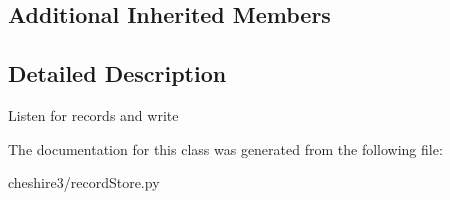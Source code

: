 \subsection*{Additional Inherited Members}


\subsection{Detailed Description}
\begin{DoxyVerb}Listen for records and write \end{DoxyVerb}
 

The documentation for this class was generated from the following file\-:\begin{DoxyCompactItemize}
\item 
cheshire3/record\-Store.\-py\end{DoxyCompactItemize}
